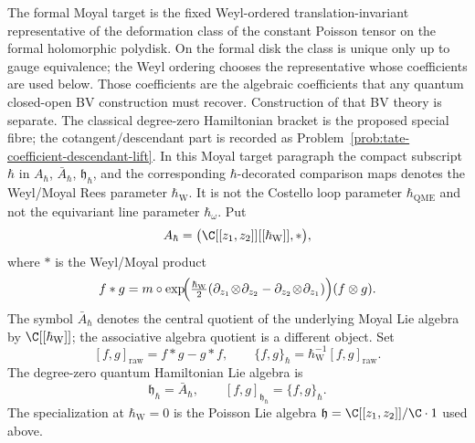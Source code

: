 \documentclass[11pt]{memoir}
\begin{document}
\medskip\noindent
The formal Moyal target is the fixed Weyl-ordered
translation-invariant representative of the deformation class of the
constant Poisson tensor on the formal holomorphic polydisk.  On the
formal disk the class is unique only up to gauge equivalence; the Weyl
ordering chooses the representative whose coefficients are used below.
Those coefficients are the algebraic coefficients that any quantum
closed-open BV construction must recover.  Construction of that BV
theory is separate.  The classical degree-zero Hamiltonian bracket is the
proposed special fibre; the cotangent/descendant part is recorded as
Problem~\ref{prob:tate-coefficient-descendant-lift}.
In this Moyal target paragraph the compact subscript \(\hbar\) in
\(A_\hbar\), \(\bar A_\hbar\), \(\mathfrak h_\hbar\), and the corresponding
\(\hbar\)-decorated comparison maps denotes the Weyl/Moyal Rees parameter
\(\hbar_{\mathrm{W}}\).  It is not the Costello loop parameter
\(\hbar_{\mathrm{QME}}\) and not the equivariant line parameter
\(\hbar_\omega\).
Put
$$A_\hbar=\bigl(\C[[z_1,z_2]][[\hbar_{\mathrm{W}}]],*\bigr),$$
where $*$ is the Weyl/Moyal product
$$f*g=m\circ\exp\!\Bigl(\tfrac{\hbar_{\mathrm{W}}}{2}
  (\partial_{z_1}\!\otimes\!\partial_{z_2}
   -\partial_{z_2}\!\otimes\!\partial_{z_1})\Bigr)(f\otimes g) .$$
The symbol $\bar A_\hbar$ denotes the central quotient of the underlying
Moyal Lie algebra by \(\C[[\hbar_{\mathrm{W}}]]\); the associative algebra quotient is a
different object.  Set
$$[f,g]_{\mathrm{raw}}=f*g-g*f,\qquad
  \{f,g\}_\hbar=\hbar_{\mathrm{W}}^{-1}[f,g]_{\mathrm{raw}}.$$
The degree-zero quantum Hamiltonian Lie algebra is
$$\mathfrak h_\hbar=\bar A_\hbar,\qquad
  [f,g]_{\mathfrak h_\hbar}=\{f,g\}_\hbar.$$
The specialization at \(\hbar_{\mathrm{W}}=0\) is the Poisson Lie algebra
$\mathfrak h=\C[[z_1,z_2]]/\C\cdot1$ used above.
\end{document}
